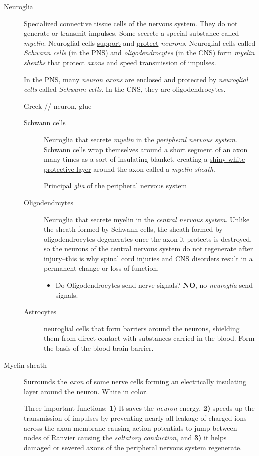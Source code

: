 \documentclass[11pt]{article}
\begin{document}
\begin{description}
\item[{Neuroglia}] Specialized connective tissue cells of the nervous system.
They do not generate or transmit impulses. Some secrete a special
substance called \emph{myelin}. Neuroglial cells \uline{support} and \uline{protect} \emph{neurons}.
Neuroglial cells called \emph{Schwann cells} (in the PNS) and \emph{oligodendrocytes}
(in the CNS) form \emph{myelin sheaths} that \uline{protect} \emph{axons} and \uline{speed
transmission} of impulses.

In the PNS, many \emph{neuron axons} are enclosed and protected by \emph{neuroglial
cells} called \emph{Schwann cells}. In the CNS, they are oligodendrocytes.

Greek // neuron, glue
\begin{description}
\item[{Schwann cells}] Neuroglia that secrete \emph{myelin} in the \emph{peripheral
nervous system}. Schwann cells wrap themselves around a short
segment of an axon many times as a sort of insulating blanket,
creating a \uline{shiny white protective layer} around the axon called a
\emph{myelin sheath}.

Principal \emph{glia} of the peripheral nervous system
\item[{Oligodendrcytes}] Neuroglia that secrete myelin in the \emph{central
nervous system}. Unlike the sheath formed by Schwann cells, the
sheath formed by oligodendrocytes degenerates once the axon it
protects is destroyed, so the neurons of the central nervous
system do not regenerate after injury--this is why spinal cord
injuries and CNS disorders result in a permanent change or loss of
function.
\begin{itemize}
\item Do Oligodendrocytes send nerve signals? \textbf{NO}, no \emph{neuroglia} send
signals.
\end{itemize}
\item[{Astrocytes}] neuroglial cells that form barriers around the neurons,
shielding them from direct contact with substances carried in the
blood. Form the basis of the blood-brain barrier.
\end{description}

\item[{Myelin sheath}] Surrounds the \emph{axon} of some nerve cells forming an
electrically insulating layer around the neuron. White in color.

Three important functions: \textbf{1)} It saves the \emph{neuron} energy, \textbf{2)} speeds up
the transmission of impulses by preventing nearly all leakage of
charged ions across the axon membrane causing action potentials to jump
between nodes of Ranvier causing the \emph{saltatory conduction}, and \textbf{3)} it
helps damaged or severed axons of the peripheral nervous system
regenerate.
\end{description}
\end{document}
